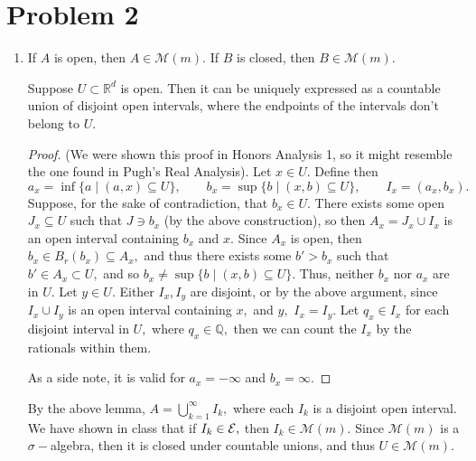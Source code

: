 \documentclass[11pt]{article}
\newcommand{\bbQ}{\mathbb{Q}}
\newcommand{\bbR}{\mathbb{R}}
\begin{document}
\newpage

\newpage
\section*{Problem 2}
\begin{problem}
    \begin{enumerate}
        \item If $A$ is open, then $A \in \mathcal{M}(m).$ If $B$ is closed, then $B \in \mathcal{M}(m).$
        \begin{solution}
            \begin{lemma}
                Suppose $U\subset \bbR^d$ is open. Then it can be uniquely expressed as a countable union of disjoint open intervals, where the endpoints of the intervals don't belong to $U.$ 
            \end{lemma} 
            \begin{proof}
            (We were shown this proof in Honors Analysis 1, so it might resemble the one found in Pugh's Real Analysis). 
                Let $x\in U.$ Define then 
                \[a_x = \inf\{a \mid (a,x) \subseteq U\}, \qquad b_x = \sup\{b \mid (x,b)\subseteq U\}, \qquad I_x = (a_x, b_x).\]  Suppose, for the sake of contradiction, that $b_x \in U.$ There exists some open $J_x \subseteq U$ such that $J \ni b_x$ (by the above construction), so then $A_x = J_x \cup I_x$ is an open interval containing $b_x$ and $x.$ Since $A_x$ is open, then $b_x \in B_r(b_x) \subseteq A_x,$ and thus there exists some $b' >b_x$ such that $b' \in A_x \subset U,$ and so $b_x \neq \sup\{b \mid (x,b) \subseteq U\}.$ Thus, neither $b_x$ nor $a_x$ are in $U.$ Let $y\in U.$ Either $I_x, I_y$ are disjoint, or by the above argument, since $I_x \cup I_y$ is an open interval containing $x,$ and $y,$ $I_x = I_y.$ Let $q_x \in I_x$ for each disjoint interval in $U,$ where $q_x \in \bbQ,$ then we can count the $I_x$ by the rationals within them. 

                As a side note, it is valid for $a_x = -\infty$ and $b_x = \infty.$
            \end{proof}
            By the above lemma, $A = \bigcup_{k=1}^\infty I_k,$ where each $I_k$ is a disjoint open interval. 
            We have shown in class that if $I_k \in \cal E,$ then $I_k \in \mathcal{M}(m).$ Since $\mathcal{M}(m)$ is a $\sigma-$algebra, then it is closed under countable unions, and thus $U \in \mathcal{M}(m).$ 


\end{solution}
\end{enumerate}
\end{problem}
\end{document}
